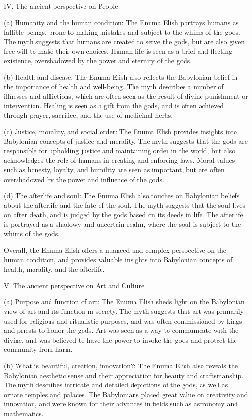 \documentclass[12pt,a4paper,english]{article}
\begin{document}
IV. The ancient perspective on People

(a) Humanity and the human condition: The Enuma Elish portrays humans as fallible beings, prone to making mistakes and subject to the whims of the gods. 
The myth suggests that humans are created to serve the gods, but are also given free will to make their own choices. 
Human life is seen as a brief and fleeting existence, overshadowed by the power and eternity of the gods.

(b) Health and disease: The Enuma Elish also reflects the Babylonian belief in the importance of health and well-being. 
The myth describes a number of illnesses and afflictions, which are often seen as the result of divine punishment or intervention. 
Healing is seen as a gift from the gods, and is often achieved through prayer, sacrifice, and the use of medicinal herbs.

(c) Justice, morality, and social order: The Enuma Elish provides insights into Babylonian concepts of justice and morality. 
The myth suggests that the gods are responsible for upholding justice and maintaining order in the world, but also acknowledges the role of humans in creating and enforcing laws. 
Moral values such as honesty, loyalty, and humility are seen as important, but are often overshadowed by the power and influence of the gods.

(d) The afterlife and soul: The Enuma Elish also touches on Babylonian beliefs about the afterlife and the fate of the soul. 
The myth suggests that the soul lives on after death, and is judged by the gods based on its deeds in life. 
The afterlife is portrayed as a shadowy and uncertain realm, where the soul is subject to the whims of the gods.

Overall, the Enuma Elish offers a nuanced and complex perspective on the human condition, and provides valuable insights into Babylonian concepts of health, morality, and the afterlife.

V. The ancient perspective on Art and Culture

(a) Purpose and function of art: The Enuma Elish sheds light on the Babylonian view of art and its function in society. 
The myth suggests that art was primarily used for religious and ritualistic purposes, and was often commissioned by kings and priests to honor the gods. 
Art was seen as a way to communicate with the divine, and was believed to have the power to invoke the gods and protect the community from harm.

(b) What is beautiful, creation, innovation?: The Enuma Elish also reveals the Babylonian aesthetic sense and their appreciation for beauty and craftsmanship. 
The myth describes intricate and detailed depictions of the gods, as well as ornate temples and palaces. 
The Babylonians placed great value on creativity and innovation, and were known for their advances in fields such as astronomy and mathematics.
\end{document}
